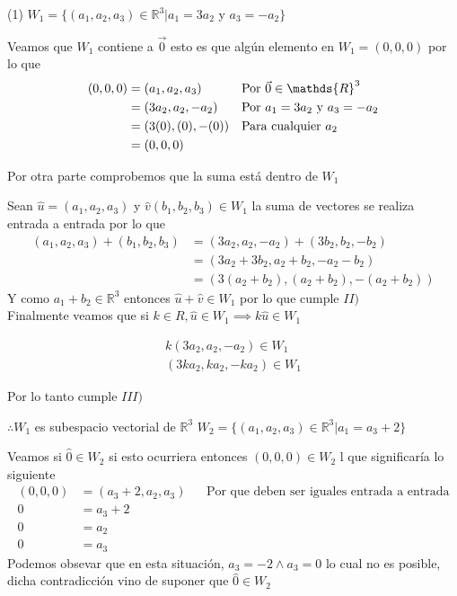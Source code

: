 \documentclass[letterpaper]{article}
\newcommand{\R}{\mathds{R}}
\renewcommand{\*}{\cdot}
\theoremstyle{definition}
\begin{document}
\begin{tasks}(1)
\task $W_{1} = \lbrace (a_{1},a_{2},a_{3}) \in \mathbb{R}^{3} \big\vert  a_{1}=3a_{2}$ y $a_{3}=-a_{2} \rbrace$

Veamos que $ W_{1} $ contiene a $ \vec{0} $ esto es que algún elemento en $ W_{1} = (0,0,0) $ por lo que 
	\begin{align*}
		(0,0,0) &= (a_{1},a_{2},a_{3}) && \text{Por $ \vec{0} \in \R^3 $}\\
		&= (3a_{2},a_{2},-a_{2}) && \text{Por $a_{1}=3a_{2}$ y $a_{3}=-a_{2}$}\\
		&= (3(0),(0),-(0)) && \text{Para cualquier $ a_2 $}\\
		&= (0,0,0)
	\end{align*}
	
Por otra parte comprobemos que la suma está dentro de $ W_1 $ 

Sean $ \hat{u} = (a_{1},a_{2},a_{3})  $ y $\hat{v} (b_{1},b_{2},b_{3})  \in W_1$ la suma de vectores se realiza entrada a entrada por lo que
\begin{align*}
	(a_{1},a_{2},a_{3}) + (b_{1},b_{2},b_{3}) &= (3a_{2},a_{2},-a_{2}) + (3b_{2},b_{2},-b_{2})\\
	&= (3 a_2 + 3b_2, a_2 + b_2, -a_2 - b_2)\\
	&= (3( a_2 + b_2), (a_2 + b_2), -(a_2 +b_2))
\end{align*}
 Y como $ a_1 + b_2 \in \R^3$ entonces $ \hat{u} + \hat{v} \in W_1 $ por lo que cumple $ II) $\\
 
 Finalmente veamos que si $ k \in R, \hat{u} \in W_1 \implies k\hat{u} \in W_1$
 
	\begin{align*}
		k(3a_2, a_2, -a_2) \in W_1\\
		(3ka_2, ka_2, -ka_2) \in W_1
	\end{align*}
	
	Por lo tanto cumple $ III) $ 
	
	$ \therefore W_1  $ es subespacio vectorial de $ \R^3 $
\task $W_{2} = \lbrace (a_{1},a_{2},a_{3}) \in \mathbb{R}^{3} \big\vert  a_{1} = a_{3} + 2 \rbrace$

Veamos si $ \hat{0} \in W_2 $ si esto ocurriera entonces $ (0,0,0)  \in W_2$ l que significaría lo siguiente
\begin{align*}
	(0,0,0) &= (a_3 + 2, a_2, a_3) && \text{Por que deben ser iguales entrada a entrada}\\
	0 &= a_3 + 2\\
	0 &= a_2 \\
	0 &= a_3 
\end{align*}
Podemos obsevar que en esta situación, $ a_3 = -2 \land a_3 = 0 $ lo cual no es posible, dicha contradicción vino de suponer que $ \hat{0} \in W_2 $


\end{tasks}
\end{document}
